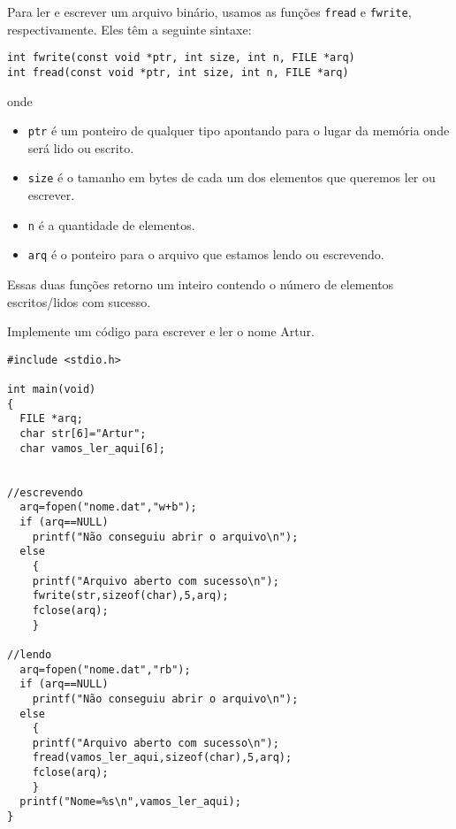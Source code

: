 Para ler e escrever um arquivo binário, usamos as funções \verb|fread| e \verb|fwrite|, respectivamente. Eles têm a seguinte sintaxe:
\begin{verbatim}
int fwrite(const void *ptr, int size, int n, FILE *arq)
int fread(const void *ptr, int size, int n, FILE *arq)
\end{verbatim}
onde
\begin{itemize}
 \item \verb|ptr| é um ponteiro de qualquer tipo apontando para o lugar da memória onde será lido ou escrito.
 \item \verb|size| é o tamanho em bytes de cada um dos elementos que queremos ler ou escrever.
 \item \verb|n| é a quantidade de elementos.
 \item \verb|arq| é o ponteiro para o arquivo que estamos lendo ou escrevendo.
\end{itemize}
Essas duas funções retorno um inteiro contendo o número de elementos escritos/lidos com sucesso.
\begin{ex}
Implemente um código para escrever e ler o nome Artur.
\end{ex}
\begin{verbatim}
#include <stdio.h>

int main(void)
{
  FILE *arq;
  char str[6]="Artur";
  char vamos_ler_aqui[6];


//escrevendo 
  arq=fopen("nome.dat","w+b");
  if (arq==NULL) 
    printf("Não conseguiu abrir o arquivo\n");
  else 
    {
    printf("Arquivo aberto com sucesso\n");
    fwrite(str,sizeof(char),5,arq);
    fclose(arq);
    }

//lendo
  arq=fopen("nome.dat","rb");
  if (arq==NULL) 
    printf("Não conseguiu abrir o arquivo\n");
  else 
    {
    printf("Arquivo aberto com sucesso\n");
    fread(vamos_ler_aqui,sizeof(char),5,arq);
    fclose(arq);
    }
  printf("Nome=%s\n",vamos_ler_aqui);
}
\end{verbatim}


